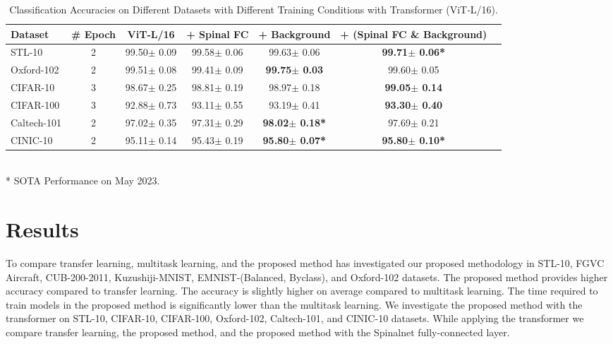 \documentclass{article}
\begin{document}
\begin{table*}[t]
\caption{Classification Accuracies on Different Datasets with Different Training Conditions with Transformer (ViT‑L/16).}
\label{TTransformer}
\vskip 0.15in
\begin{center}
\begin{small}
\begin{sc}
\begin{tabular}{lcccccr}
\toprule
Dataset & \# Epoch & ViT‑L/16 & + Spinal FC & + Background & + (Spinal FC \& Background) \\
\midrule  
STL-10  &2 &99.50$\pm$ 0.09& 99.58$\pm$ 0.06& 99.63$\pm$ 0.06 & \bf{99.71$\pm$ 0.06}* \\
Oxford-102  &2 &99.51$\pm$ 0.08& 99.41$\pm$ 0.09& \bf{99.75$\pm$ 0.03} & 99.60$\pm$ 0.05 \\
CIFAR-10  &3 &98.67$\pm$ 0.25& 98.81$\pm$ 0.19& 98.97$\pm$ 0.18 & \bf{99.05$\pm$ 0.14} \\
CIFAR-100  &3 &92.88$\pm$ 0.73& 93.11$\pm$ 0.55& 93.19$\pm$ 0.41& \bf{93.30$\pm$ 0.40} \\
Caltech-101  &2 &97.02$\pm$ 0.35& 97.31$\pm$ 0.29& \bf{98.02$\pm$ 0.18}*& 97.69$\pm$ 0.21 \\
CINIC-10  &2 &95.11$\pm$ 0.14& 95.43$\pm$ 0.19& \bf{95.80$\pm$ 0.07}* & \bf{95.80$\pm$ 0.10}* \\


\bottomrule
\end{tabular}
\\ * SOTA Performance on May 2023.
\end{sc}
\end{small}
\end{center}
\vskip -0.1in
\end{table*}


\section{Results}
To compare transfer learning, multitask learning, and the proposed method has investigated our proposed methodology in STL-10, FGVC Aircraft, CUB-200-2011, Kuzushiji-MNIST, EMNIST-(Balanced, Byclass), and Oxford-102 datasets. The proposed method provides higher accuracy compared to transfer learning. The accuracy is slightly higher on average compared to multitask learning. The time required to train models in the proposed method is significantly lower than the multitask learning. We investigate the proposed method with the transformer on STL-10, CIFAR-10, CIFAR-100, Oxford-102, Caltech-101, and CINIC-10 datasets. While applying the transformer we compare transfer learning, the proposed method, and the proposed method with the Spinalnet fully-connected layer.
\end{document}
